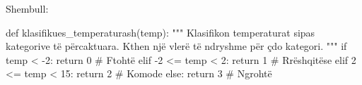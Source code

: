 \documentclass[
  ignorenonframetext,
]{beamer}
\newenvironment{Shaded}{\begin{snugshade}}{\end{snugshade}}
\newcommand{\NormalTok}[1]{#1}
\begin{document}
\begin{frame}[fragile]{Shembull:}
\protect\hypertarget{shembull-8}{}
\begin{Shaded}
\begin{Highlighting}[]

\NormalTok{def klasifikues\_temperaturash(temp):}
\NormalTok{    """}
\NormalTok{    Klasifikon temperaturat sipas kategorive të përcaktuara.}
\NormalTok{    Kthen një vlerë të ndryshme për çdo kategori.}
\NormalTok{    """}
\NormalTok{    if temp \textless{} {-}2:}
\NormalTok{        return 0  \# Ftohtë}
\NormalTok{    elif {-}2 \textless{}= temp \textless{} 2:}
\NormalTok{        return 1  \# Rrëshqitëse}
\NormalTok{    elif 2 \textless{}= temp \textless{} 15:}
\NormalTok{        return 2  \# Komode}
\NormalTok{    else:}
\NormalTok{        return 3  \# Ngrohtë}
\end{Highlighting}
\end{Shaded}
\end{frame}
\end{document}
